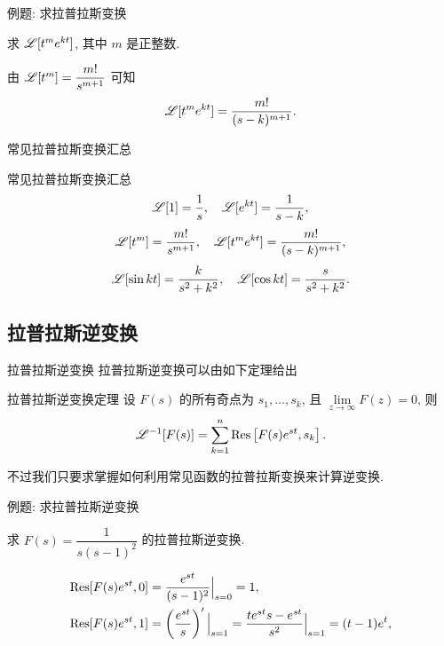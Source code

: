 \begin{frame}{例题: 求拉普拉斯变换}
	\onslide<+->
	\begin{example}
		求 $\mathscr{L}[t^me^{kt}]$, 其中 $m$ 是正整数.
	\end{example}

	\onslide<+->
	\begin{solution}
		由 $\mathscr{L}[t^m]=\dfrac{m!}{s^{m+1}}$ 可知
		\[\mathscr{L}[t^me^{kt}]=\frac{m!}{(s-k)^{m+1}}.\]
	\end{solution}
\end{frame}


\begin{frame}{常见拉普拉斯变换汇总}
	\onslide<+->
	\begin{alertblock}{常见拉普拉斯变换汇总}
		\[\mathscr{L}[1]=\frac1s,\quad \mathscr{L}[e^{kt}]=\frac1{s-k},\]
		\[\mathscr{L}[t^m]=\frac{m!}{s^{m+1}},\quad \mathscr{L}[t^me^{kt}]=\frac{m!}{(s-k)^{m+1}},\]
		\[\mathscr{L}[\sin kt]=\frac{k}{s^2+k^2},\quad
		\mathscr{L}[\cos kt]=\frac{s}{s^2+k^2}.\]
	\end{alertblock}
\end{frame}


\subsection{拉普拉斯逆变换}

\begin{frame}{拉普拉斯逆变换}
	\onslide<+->
	拉普拉斯逆变换可以由如下定理给出
	\begin{block}{拉普拉斯逆变换定理}
		设 $F(s)$ 的所有奇点为 $s_1,\dots,s_k$, 且 $\lim\limits_{z\to\infty}F(z)=0$, 则
		\[\mathscr{L}^{-1}[F(s)]=\sum_{k=1}^n {\mathrm{Res}}\left[F(s)e^{st},s_k\right].\]
	\end{block}

	\onslide<+->
	不过我们只要求掌握如何利用常见函数的拉普拉斯变换来计算逆变换.
\end{frame}


\begin{frame}{例题: 求拉普拉斯逆变换}
	\onslide<+->
	\begin{example}
		求 $F(s)=\dfrac1{s(s-1)^2}$ 的拉普拉斯逆变换.
	\end{example}

	\onslide<+->
	\begin{solution}
			\begin{align*}
				{\mathrm{Res}}[F(s)e^{st},0]&=\frac{e^{st}}{(s-1)^2}\Big|_{s=0}=1,\\
				{\mathrm{Res}}[F(s)e^{st},1]&=\left(\frac{e^{st}}s\right)'\Big|_{s=1}=\frac{te^{st}s-e^{st}}{s^2}\Big|_{s=1}=(t-1)e^t,
			\end{align*}%
		\onslide<+->{%
			故 $\msl^{-1}[F(s)]=1+(t-1)e^t$.
		}
	\end{solution}
\end{frame}


